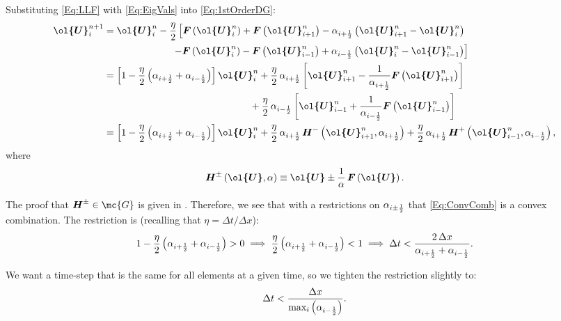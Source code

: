 \documentclass[10pt,preprint]{aastex}
\begin{document}
Substituting \eqref{Eq:LLF} with \eqref{Eq:EigVals} into \eqref{Eq:1stOrderDG}:
\begin{align}
    \vect{\ol{U}}^{n+1}_{i}&=\vect{\ol{U}}^{n}_{i}-\f{\eta}{2}\left[\vect{F}\left(\vect{\ol{U}}^{n}_{i}\right)+\vect{F}\left(\vect{\ol{U}}^{n}_{i+1}\right)-\alpha_{i+\f{1}{2}}\left(\vect{\ol{U}}^{n}_{i+1}-\vect{\ol{U}}^{n}_{i}\right)\right.\nonumber\\
    &\left.\hspace{7em}-\vect{F}\left(\vect{\ol{U}}^{n}_{i}\right)-\vect{F}\left(\vect{\ol{U}}^{n}_{i-1}\right)+\alpha_{i-\f{1}{2}}\left(\vect{\ol{U}}^{n}_{i}-\vect{\ol{U}}^{n}_{i-1}\right)\right]\nonumber\\
    &=\left[1-\f{\eta}{2}\left(\alpha_{i+\f{1}{2}}+\alpha_{i-\f{1}{2}}\right)\right]\vect{\ol{U}}^{n}_{i}+\f{\eta}{2}\,\alpha_{i+\f{1}{2}}\left[\vect{\ol{U}}^{n}_{i+1}-\f{1}{\alpha_{i+\f{1}{2}}}\vect{F}\left(\vect{\ol{U}}^{n}_{i+1}\right)\right]\nonumber\\
    &\hspace{15em}+\f{\eta}{2}\,\alpha_{i-\f{1}{2}}\left[\vect{\ol{U}}^{n}_{i-1}+\f{1}{\alpha_{i-\f{1}{2}}}\vect{F}\left(\vect{\ol{U}}^{n}_{i-1}\right)\right]\nonumber\\
    &=\left[1-\f{\eta}{2}\left(\alpha_{i+\f{1}{2}}+\alpha_{i-\f{1}{2}}\right)\right]\vect{\ol{U}}^{n}_{i}+\f{\eta}{2}\,\alpha_{i+\f{1}{2}}\,\vect{H}^{-}\left(\vect{\ol{U}}^{n}_{i+1},\alpha_{i+\f{1}{2}}\right)+\f{\eta}{2}\,\alpha_{i+\f{1}{2}}\,\vect{H}^{+}\left(\vect{\ol{U}}^{n}_{i-1},\alpha_{i-\f{1}{2}}\right),\label{Eq:ConvComb}
\end{align}
where
\begin{equation}\label{Eq:Hpm}
    \vect{H}^{\pm}\left(\vect{\ol{U}},\alpha\right)\equiv\vect{\ol{U}}\pm\f{1}{\alpha}\,\vect{F}\left(\vect{\ol{U}}\right).
\end{equation}

The proof that $\vect{H}^{\pm}\in\mc{G}$ is given in \citet{Qin2016}. Therefore, we see that with a restrictions on $\alpha_{i\pm\frac{1}{2}}$ that \eqref{Eq:ConvComb} is a convex combination. The restriction is (recalling that $\eta=\Delta t/\Delta x$):
\begin{equation*}
    1-\frac{\eta}{2}\left(\alpha_{i+\frac{1}{2}}+\alpha_{i-\frac{1}{2}}\right)>0\implies\frac{\eta}{2}\left(\alpha_{i+\frac{1}{2}}+\alpha_{i-\frac{1}{2}}\right)<1\implies \Delta t<\frac{2\,\Delta x}{\alpha_{i+\frac{1}{2}}+\alpha_{i-\frac{1}{2}}}.
\end{equation*}

We want a time-step that is the same for all elements at a given time, so we tighten the restriction slightly to:
\begin{equation*}
    \Delta t<\frac{\Delta x}{\text{max}_{i}\left(\alpha_{i-\frac{1}{2}}\right)}.
\end{equation*}
\end{document}
